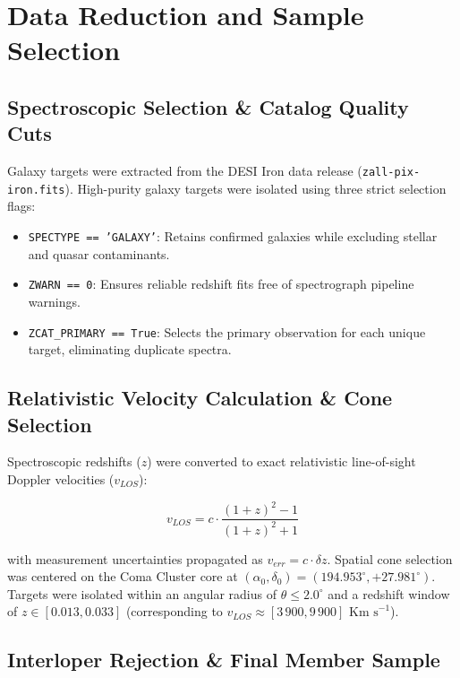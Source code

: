 \documentclass[twocolumn]{aastex631}
\begin{document}
\section{Data Reduction and Sample Selection}
\label{sec:sample_selection}
\subsection{Spectroscopic Selection \& Catalog Quality Cuts}

Galaxy targets were extracted from the DESI Iron data release (\texttt{zall-pix-iron.fits}). High-purity galaxy targets were isolated using three strict selection flags:

\begin{itemize}
	\item \texttt{SPECTYPE == 'GALAXY'}: Retains confirmed galaxies while excluding stellar and quasar contaminants.

	\item \texttt{ZWARN == 0}: Ensures reliable redshift fits free of spectrograph pipeline warnings.

	\item \texttt{ZCAT_PRIMARY == True}: Selects the primary observation for each unique target, eliminating duplicate spectra.

\end{itemize}

\subsection{Relativistic Velocity Calculation \& Cone Selection}
Spectroscopic redshifts ($z$) were converted to exact relativistic line-of-sight Doppler velocities ($v_{LOS}$):

\begin{equation}
	v_{LOS}=c \cdot \frac{(1+z)^{2}-1}{(1+z)^{2}+1}
\end{equation}

with measurement uncertainties propagated as $v_{err} = c \cdot \delta z$.
Spatial cone selection was centered on the Coma Cluster core at $(\alpha_{0},\delta_{0}) = (194.953^{\circ},+27.981^{\circ})$.
Targets were isolated within an angular radius of $\theta \leq 2.0^{\circ}$ and a redshift window of $z \in [0.013, 0.033]$ (corresponding to $v_{LOS} \approx [3\,900, 9\,900] \text{ Km s}^{-1}$).

\subsection{Interloper Rejection \& Final Member Sample}
\end{document}
